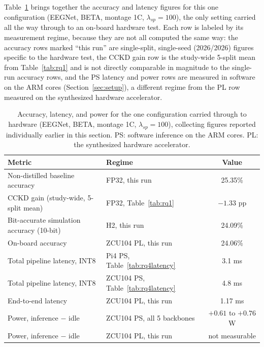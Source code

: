 \documentclass[11pt,a4paper,twoside,asymmetric]{article}
\begin{document}
Table~\ref{tab:deploysummary} brings together the accuracy and latency figures for this one configuration (EEGNet, BETA, montage 1C, $\lambda_{sp}=100$), the only setting carried all the way through to an on-board hardware test. Each row is labeled by its measurement regime, because they are not all computed the same way: the accuracy rows marked ``this run'' are single-split, single-seed (2026/2026) figures specific to the hardware test, the CCKD gain row is the study-wide 5-split mean from Table~\ref{tab:rq1} and is not directly comparable in magnitude to the single-run accuracy rows, and the PS latency and power rows are measured in software on the ARM cores (Section~\ref{sec:setup}), a different regime from the PL row measured on the synthesized hardware accelerator.

\begin{table}[htbp]
\caption{Accuracy, latency, and power for the one configuration carried through to hardware (EEGNet, BETA, montage 1C, $\lambda_{sp}=100$), collecting figures reported individually earlier in this section. PS: software inference on the ARM cores. PL: the synthesized hardware accelerator.}
\label{tab:deploysummary}
\begin{center}
\footnotesize
\begin{tabular}{llc}
\toprule
Metric & Regime & Value \\
\midrule
Non-distilled baseline accuracy & FP32, this run & 25.35\% \\
CCKD gain (study-wide, 5-split mean) & FP32, Table~\ref{tab:rq1} & $-1.33$ pp \\
Bit-accurate simulation accuracy (10-bit) & H2, this run & 24.09\% \\
On-board accuracy & ZCU104 PL, this run & 24.06\% \\
Total pipeline latency, INT8 & Pi4 PS, Table~\ref{tab:rq4latency} & 3.1 ms \\
Total pipeline latency, INT8 & ZCU104 PS, Table~\ref{tab:rq4latency} & 4.8 ms \\
End-to-end latency & ZCU104 PL, this run & 1.17 ms \\
Power, inference $-$ idle & ZCU104 PS, all 5 backbones & $+0.61$ to $+0.76$ W \\
Power, inference $-$ idle & ZCU104 PL, this run & not measurable \\
\bottomrule
\end{tabular}
\end{center}
\end{table}
\end{document}
